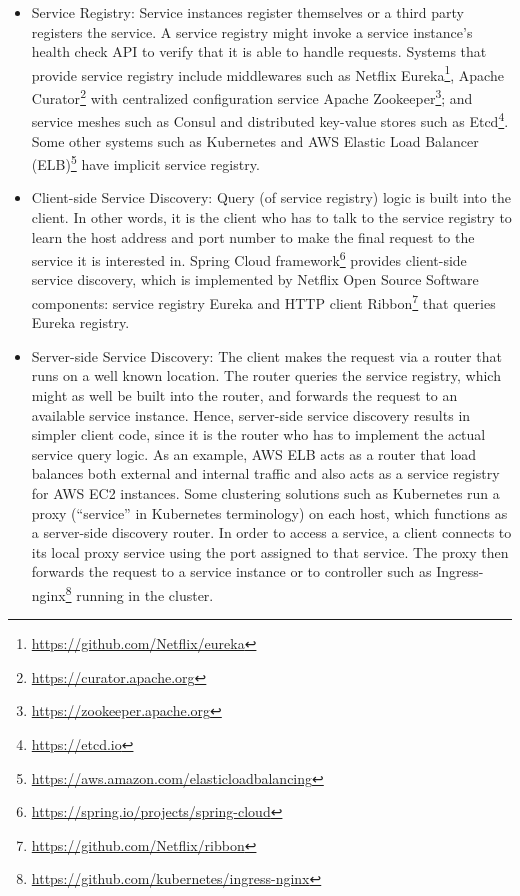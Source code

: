 \documentclass{Configuration_Files/PoliMi3i_thesis}
\begin{document}
\begin{itemize}
    \item Service Registry: Service instances register themselves or a third party registers the service.
    A service registry might invoke a service instance’s health check API to verify that it is able to handle requests.
    Systems that provide service registry include middlewares such as Netflix Eureka\footnote{\href{https://github.com/Netflix/eureka}{https://github.com/Netflix/eureka}}, Apache Curator\footnote{\href{https://curator.apache.org}{https://curator.apache.org}} with centralized configuration service Apache Zookeeper\footnote{\href{https://zookeeper.apache.org}{https://zookeeper.apache.org}}; and service meshes such as Consul and distributed key-value stores such as Etcd\footnote{\href{https://etcd.io}{https://etcd.io}}.
    Some other systems such as Kubernetes and AWS Elastic Load Balancer (ELB)\footnote{\href{https://aws.amazon.com/elasticloadbalancing}{https://aws.amazon.com/elasticloadbalancing}} have implicit service registry.
    
    \item Client-side Service Discovery: Query (of service registry) logic is built into the client.
    In other words, it is the client who has to talk to the service registry to learn the host address and port number to make the final request to the service it is interested in.
    Spring Cloud framework\footnote{\href{https://spring.io/projects/spring-cloud}{https://spring.io/projects/spring-cloud}} provides client-side service discovery, which is implemented by Netflix Open Source Software components: service registry Eureka and HTTP client Ribbon\footnote{\href{https://github.com/Netflix/ribbon}{https://github.com/Netflix/ribbon}} that queries Eureka registry.
    
    \item Server-side Service Discovery: The client makes the request via a router that runs on a well known location.
    The router queries the service registry, which might as well be built into the router, and forwards the request to an available service instance.
    Hence, server-side service discovery results in simpler client code, since it is the router who has to implement the actual service query logic.
    As an example, AWS ELB acts as a router that load balances both external and internal traffic and also acts as a service registry for AWS EC2 instances.
    Some clustering solutions such as Kubernetes run a proxy (“service” in Kubernetes terminology) on each host, which functions as a server-side discovery router.
    In order to access a service, a client connects to its local proxy service using the port assigned to that service.
    The proxy then forwards the request to a service instance or to controller such as Ingress-nginx\footnote{\href{https://github.com/kubernetes/ingress-nginx}{https://github.com/kubernetes/ingress-nginx}} running in the cluster.

\end{itemize}
\end{document}
